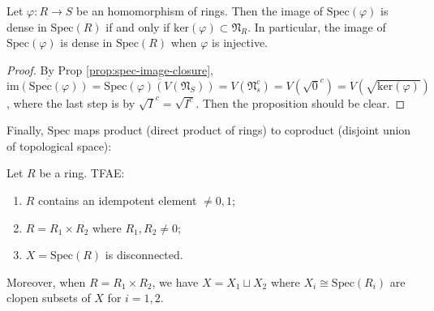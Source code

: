 \documentclass{note-eng}
\begin{document}
\begin{proposition}
    Let $\varphi: R \rightarrow S$ be an homomorphism of rings. Then the image of $\mathrm{Spec}(\varphi)$ is dense in $\mathrm{Spec}(R)$ if and only if $\mathrm{ker}(\varphi) \subset \mathfrak{N}_R$. In particular, the image of $\mathrm{Spec}(\varphi)$ is dense in $\mathrm{Spec}(R)$ when $\varphi$ is injective.
\end{proposition}

\begin{proof}
    By Prop \ref{prop:spec-image-closure}, $\overline{\mathrm{im}(\mathrm{Spec}(\varphi))} = \overline{\mathrm{Spec}(\varphi)(V(\mathfrak{N}_S))} = V(\mathfrak{N}_s^c) = V(\sqrt{0}^c) = V\left(\sqrt{\mathrm{ker}(\varphi)}\right)$, where the last step is by $\sqrt{I}^c = \sqrt{I^c}$. Then the proposition should be clear.
\end{proof}

Finally, $\mathrm{Spec}$ maps product (direct product of rings) to coproduct (disjoint union of topological space):

\begin{proposition}
    Let $R$ be a ring. TFAE:
    \begin{enumerate}
        \item $R$ contains an idempotent element $\ne 0, 1$;
        \item $R = R_1 \times R_2$ where $R_1, R_2 \ne 0$;
        \item $X = \mathrm{Spec}(R)$ is disconnected.
    \end{enumerate}
    Moreover, when $R = R_1 \times R_2$, we have $X = X_1 \sqcup X_2$ where $X_i \cong \mathrm{Spec}(R_i)$ are clopen subsets of $X$ for $i = 1, 2$.
\end{proposition}
\end{document}
